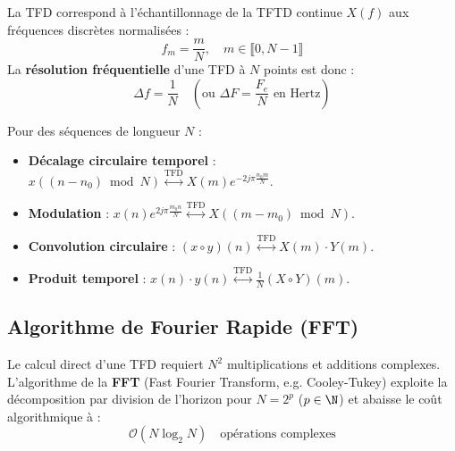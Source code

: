 \begin{remark}
    La TFD correspond à l'échantillonnage de la TFTD continue $X(f)$ aux fréquences discrètes normalisées :
    $$ f_m = \frac{m}{N}, \quad m \in \llbracket 0, N-1 \rrbracket $$
    La \textbf{résolution fréquentielle} d'une TFD à $N$ points est donc :
    \begin{equation}
        \Delta f = \frac{1}{N} \quad (\text{ou } \Delta F = \frac{F_e}{N} \text{ en Hertz})
    \end{equation}
\end{remark}

\begin{prop}
    Pour des séquences de longueur $N$ :
    \begin{itemize}
        \item \textbf{Décalage circulaire temporel} : $x((n - n_0) \bmod N) \overset{\text{TFD}}{\longleftrightarrow} X(m) e^{-2j \pi \frac{n_0 m}{N}}$.
        \item \textbf{Modulation} : $x(n) e^{2j \pi \frac{m_0 n}{N}} \overset{\text{TFD}}{\longleftrightarrow} X((m - m_0) \bmod N)$.
        \item \textbf{Convolution circulaire} : $(x \circ y)(n) \overset{\text{TFD}}{\longleftrightarrow} X(m) \cdot Y(m)$.
        \item \textbf{Produit temporel} : $x(n) \cdot y(n) \overset{\text{TFD}}{\longleftrightarrow} \frac{1}{N} (X \circ Y)(m)$.
    \end{itemize}
\end{prop}

\subsection{Algorithme de Fourier Rapide (FFT)}

\begin{proposition}
    Le calcul direct d'une TFD requiert $N^2$ multiplications et additions complexes. 
    L'algorithme de la \textbf{FFT} (Fast Fourier Transform, e.g. Cooley-Tukey) exploite la décomposition par division de l'horizon pour $N = 2^p$ ($p \in \N$) et abaisse le coût algorithmique à :
    \begin{equation}
        \mathcal{O}(N \log_2 N) \quad \text{opérations complexes}
    \end{equation}
\end{proposition}


